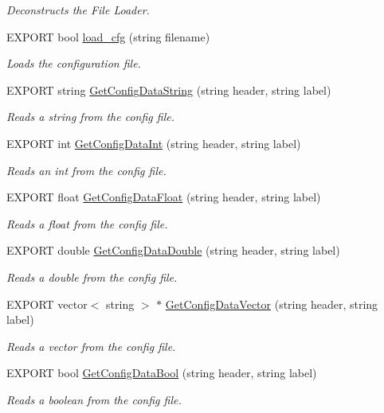 \begin{DoxyCompactItemize}
\begin{DoxyCompactList}\small\item\em \-Deconstructs the \-File \-Loader. \end{DoxyCompactList}\item 
\-E\-X\-P\-O\-R\-T bool \hyperlink{class_file_loader_a06b5b74d0e3589d9c17c2d6c46f6f155}{load\-\_\-cfg} (string filename)
\begin{DoxyCompactList}\small\item\em \-Loads the configuration file. \end{DoxyCompactList}\item 
\-E\-X\-P\-O\-R\-T string \hyperlink{class_file_loader_ab061bced9d5b5a22f72e5855a1cc3c76}{\-Get\-Config\-Data\-String} (string header, string label)
\begin{DoxyCompactList}\small\item\em \-Reads a string from the config file. \end{DoxyCompactList}\item 
\-E\-X\-P\-O\-R\-T int \hyperlink{class_file_loader_acceb1dc42a0821124c55ae588cfde1a8}{\-Get\-Config\-Data\-Int} (string header, string label)
\begin{DoxyCompactList}\small\item\em \-Reads an int from the config file. \end{DoxyCompactList}\item 
\-E\-X\-P\-O\-R\-T float \hyperlink{class_file_loader_aa56ae634218cbae6edbd700081288d1d}{\-Get\-Config\-Data\-Float} (string header, string label)
\begin{DoxyCompactList}\small\item\em \-Reads a float from the config file. \end{DoxyCompactList}\item 
\-E\-X\-P\-O\-R\-T double \hyperlink{class_file_loader_a1b41ea0d9f59e5d7cdffb039cf4ef56e}{\-Get\-Config\-Data\-Double} (string header, string label)
\begin{DoxyCompactList}\small\item\em \-Reads a double from the config file. \end{DoxyCompactList}\item 
\-E\-X\-P\-O\-R\-T vector$<$ string $>$ $\ast$ \hyperlink{class_file_loader_a321013c5324a0c41b7687a320f2f4e05}{\-Get\-Config\-Data\-Vector} (string header, string label)
\begin{DoxyCompactList}\small\item\em \-Reads a vector from the config file. \end{DoxyCompactList}\item 
\-E\-X\-P\-O\-R\-T bool \hyperlink{class_file_loader_ac01d705d0b720e95053f9a8302b848a0}{\-Get\-Config\-Data\-Bool} (string header, string label)
\begin{DoxyCompactList}\small\item\em \-Reads a boolean from the config file. \end{DoxyCompactList}\end{DoxyCompactItemize}
